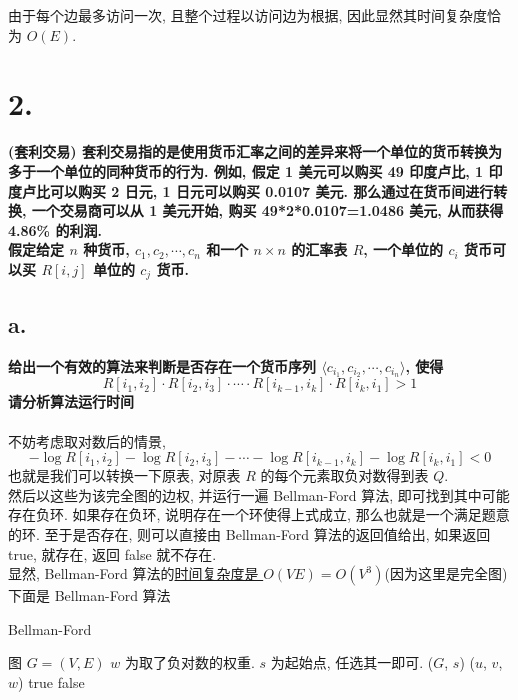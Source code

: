 \documentclass[UTF8]{article}
\newcommand{\jumpLine} {\hspace*{\fill} \\}
\begin{document}
由于每个边最多访问一次, 且整个过程以访问边为根据, 因此显然其时间复杂度恰为 $O(E)$.

\newpage
\section*{2.}
\noindent \textbf{(套利交易) 套利交易指的是使用货币汇率之间的差异来将一个单位的货币转换为多于一个单位的同种货币的行为. 例如, 假定 1 美元可以购买 49 印度卢比, 1 印度卢比可以购买 2 日元, 1 日元可以购买 0.0107 美元. 那么通过在货币间进行转换, 一个交易商可以从 1 美元开始, 购买 49*2*0.0107=1.0486 美元, 从而获得 4.86\% 的利润.}\\
\textbf{假定给定 $n$ 种货币, $c_1, c_2, \cdots, c_n$ 和一个 $n\times n$ 的汇率表 $R$, 一个单位的 $c_i$ 货币可以买 $R[i,j]$ 单位的 $c_j$ 货币.}
\subsection*{a.}
\noindent \textbf{给出一个有效的算法来判断是否存在一个货币序列 $\langle c_{i_1}, c_{i_2}, \cdots, c_{i_n}\rangle$, 使得}
$$R[i_1,i_2]\cdot R[i_2,i_3] \cdot \cdots \cdot R[i_{k-1},i_k]\cdot R[i_k,i_1] > 1$$
\textbf{请分析算法运行时间}\\
\jumpLine
不妨考虑取对数后的情景, 
$$-\log R[i_1,i_2] - \log R[i_2,i_3] - \cdots - \log R[i_{k-1},i_k] - \log R[i_k,i_1] < 0$$
也就是我们可以转换一下原表, 对原表 $R$ 的每个元素取负对数得到表 $Q$.\\
然后以这些为该完全图的边权, 并运行一遍 Bellman-Ford 算法, 即可找到其中可能存在负环. 如果存在负环, 说明存在一个环使得上式成立, 那么也就是一个满足题意的环. 至于是否存在, 则可以直接由 Bellman-Ford 算法的返回值给出, 如果返回 true, 就存在, 返回 false 就不存在.\\
显然, Bellman-Ford 算法的\underline{时间复杂度是 $O(VE)=O(V^3)$}(因为这里是完全图)\\
下面是 Bellman-Ford 算法
\begin{algorithm}[H]
	\caption{{\sc Bellman-Ford}}
	\begin{algorithmic}[1] %
		\Require 图 $G=(V,E)$
		\Require $w$ 为取了负对数的权重.
		\Require $s$ 为起始点, 任选其一即可.
		($G$, $s$)
		 
				($u$, $v$, $w$)
			\EndFor
		\EndFor
			\State \Return true 
			\EndIf
		\EndFor
		\State \Return false 
		\EndFunction
	\end{algorithmic}
\end{algorithm}
\end{document}
